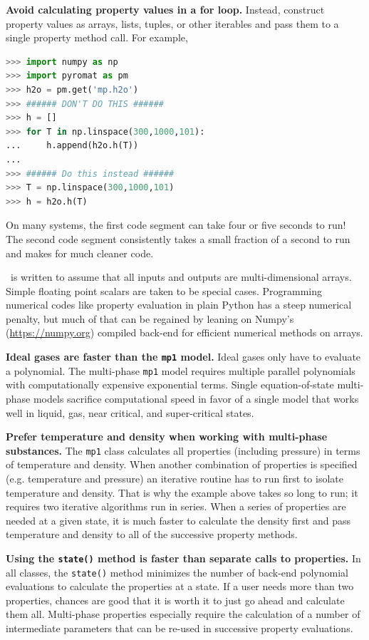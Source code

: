 {\bf Avoid calculating property values in a for loop.}  Instead, construct property values as arrays, lists, tuples, or other iterables and pass them to a single property method call.  For example,
\begin{lstlisting}[language=Python]
>>> import numpy as np
>>> import pyromat as pm
>>> h2o = pm.get('mp.h2o')
>>> ###### DON'T DO THIS ######
>>> h = []
>>> for T in np.linspace(300,1000,101):
...     h.append(h2o.h(T))
... 
>>> ###### Do this instead ######
>>> T = np.linspace(300,1000,101)
>>> h = h2o.h(T)
\end{lstlisting}
On many systems, the first code segment can take four or five seconds to run!  The second code segment consistently takes a small fraction of a second to run and makes for much cleaner code.

\PM\ is written to assume that all inputs and outputs are multi-dimensional arrays.  Simple floating point scalars are taken to be special cases.  Programming numerical codes like property evaluation in plain Python has a steep numerical penalty, but much of that can be regained by leaning on Numpy's (\url{https://numpy.org}) compiled back-end for efficient numerical methods on arrays.

{\bf Ideal gases are faster than the \texttt{mp1} model.}  Ideal gases only have to evaluate a polynomial.  The multi-phase \texttt{mp1} model requires multiple parallel polynomials with computationally expensive exponential terms.  Single equation-of-state multi-phase models sacrifice computational speed in favor of a single model that works well in liquid, gas, near critical, and super-critical states.

{\bf Prefer temperature and density when working with multi-phase substances.}  The \texttt{mp1} class calculates all properties (including pressure) in terms of temperature and density.  When another combination of properties is specified (e.g. temperature and pressure) an iterative routine has to run first to isolate temperature and density.  That is why the example above takes so long to run; it requires two iterative algorithms run in series.  When a series of properties are needed at a given state, it is much faster to calculate the density first and pass temperature and density to all of the successive property methods.

{\bf Using the \texttt{state()} method is faster than separate calls to properties.}  In all classes, the \verb|state()| method minimizes the number of back-end polynomial evaluations to calculate the properties at a state.  If a user needs more than two properties, chances are good that it is worth it to just go ahead and calculate them all.  Multi-phase properties especially require the calculation of a number of intermediate parameters that can be re-used in successive property evaluations.

